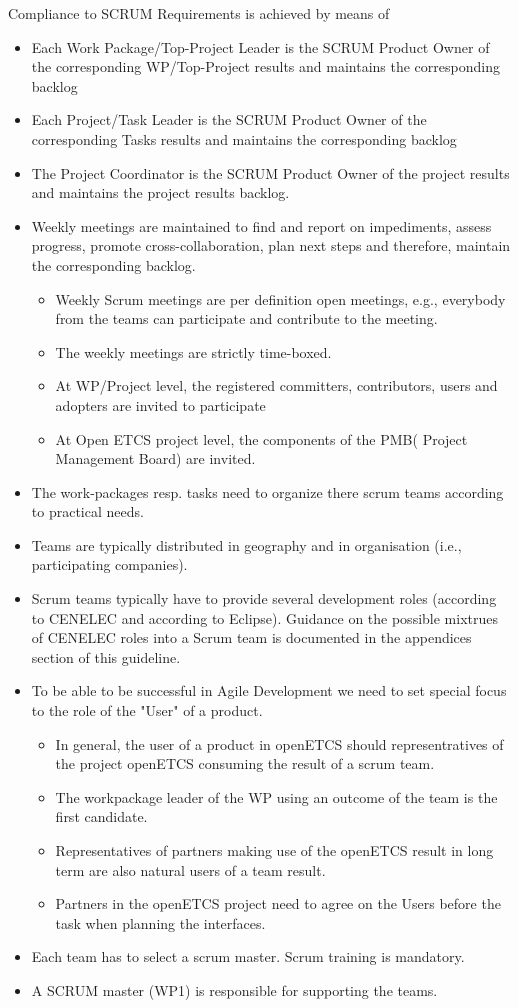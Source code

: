 \documentclass{template/openetcs_article}
\begin{document}
Compliance to SCRUM Requirements is achieved by means of
\begin{itemize}
\item Each Work Package/Top-Project Leader is the SCRUM Product Owner of the corresponding \gls{WP}/Top-Project results and maintains the corresponding backlog
\item Each Project/Task Leader is the SCRUM  Product Owner of the corresponding Tasks results  and maintains the corresponding backlog
\item The Project Coordinator is the SCRUM Product Owner of the project results and maintains the project results backlog.
\item Weekly meetings are maintained to find and report on impediments, assess progress, promote cross-collaboration, plan next steps and therefore, maintain the corresponding backlog.
\begin{itemize}
\item Weekly Scrum meetings are per definition open meetings, e.g., everybody from the teams can participate and contribute to the meeting.
\item The weekly meetings are strictly time-boxed.
\item At \gls{WP}/Project level, the registered committers, contributors, users and adopters are invited to participate
\item At Open \gls{ETCS} project level, the components of the PMB( Project Management Board) are invited.
\end{itemize} 
\item The work-packages resp. tasks need to organize there scrum teams according to practical needs.
\item Teams are typically distributed in geography and in organisation (i.e., participating companies).
\item Scrum teams typically have to provide several development roles (according to CENELEC and according to Eclipse). Guidance on the possible mixtrues of CENELEC roles into a Scrum team is documented in the appendices section of this guideline.
\item To be able to be successful in Agile Development we need to set special focus to the role of the "User" of a product.
\begin{itemize}
\item In general, the user of a product in openETCS should representratives of the project openETCS consuming the result of a scrum team. 
\item The workpackage leader of the \gls{WP} using an outcome of the team is the first candidate.
\item Representatives of partners making use of the openETCS result in long term are also natural users of a team result.
\item Partners in the openETCS project need to agree on the Users before the task when planning the interfaces. 
\end{itemize}  
\item Each team has to select a scrum master. Scrum training is mandatory.
\item A SCRUM master (WP1) is responsible for supporting the teams.
\end{itemize}
\end{document}
